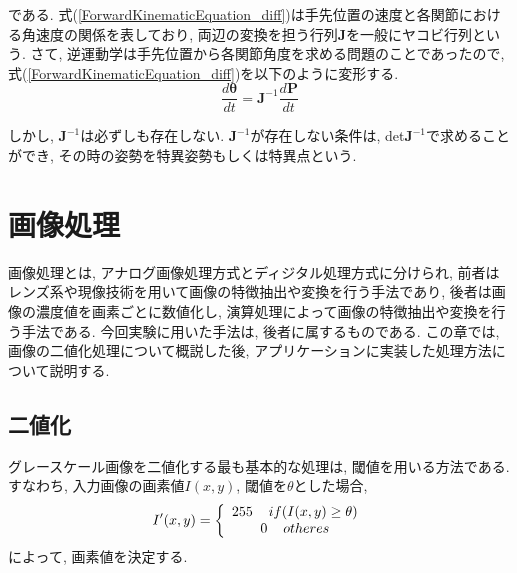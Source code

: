 \documentclass{suribt}
\begin{document}
である. 式(\ref{ForwardKinematicEquation_diff})は手先位置の速度と各関節における角速度の関係を表しており, 両辺の変換を担う行列${\bm J}$を一般にヤコビ行列という. 
さて, 逆運動学は手先位置から各関節角度を求める問題のことであったので, 式(\ref{ForwardKinematicEquation_diff})を以下のように変形する.
\begin{equation}
	\label{ForwardKinematicEquation_diff}
	\frac{d{\bm \theta}}{dt} = {\bm J}^{-1}\frac{d{\bm P}}{dt}
\end{equation}

しかし, ${\bm J^{-1}}$は必ずしも存在しない. ${\bm J^{-1}}$が存在しない条件は, det${\bm J^{-1}}$で求めることができ, その時の姿勢を特異姿勢もしくは特異点という. 

\chapter{画像処理}
画像処理とは, アナログ画像処理方式とディジタル処理方式に分けられ, 前者はレンズ系や現像技術を用いて画像の特徴抽出や変換を行う手法であり, 後者は画像の濃度値を画素ごとに数値化し, 演算処理によって画像の特徴抽出や変換を行う手法である. 今回実験に用いた手法は, 後者に属するものである. この章では, 画像の二値化処理について概説した後, アプリケーションに実装した処理方法について説明する.
\section{二値化}
グレースケール画像を二値化する最も基本的な処理は, 閾値を用いる方法である. すなわち, 入力画像の画素値$I(x, y)$, 閾値を$\theta$とした場合, 
\begin{equation}
	I'(x, y) = \left \{
		\begin{array}{c}
			255 \hspace{4mm} if (I(x, y) \geq \theta) \\
			 0   \hspace{4mm} otheres
		\end{array}
	\right.
\end{equation}
によって, 画素値を決定する. 
\end{document}
